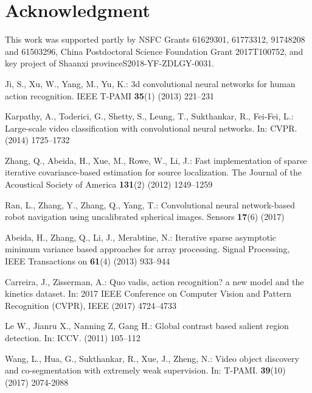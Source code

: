 \documentclass[runningheads,a4paper]{llncs}
\begin{document}
\section*{Acknowledgment}
This work was supported partly by NSFC Grants 61629301, 61773312, 91748208 and 61503296, China Postdoctoral Science Foundation Grant 2017T100752, and key project of Shaanxi provinceS2018-YF-ZDLGY-0031.

%
%
\begin{thebibliography}{10}
	Ji, S., Xu, W., Yang, M., Yu, K.:
	\newblock 3d convolutional neural networks for human action recognition.
	\newblock IEEE T-PAMI \textbf{35}(1) (2013)  221--231

	Karpathy, A., Toderici, G., Shetty, S., Leung, T., Sukthankar, R., Fei-Fei, L.:
	\newblock Large-scale video classification with convolutional neural networks.
	\newblock In: CVPR. (2014)  1725--1732

	Zhang, Q., Abeida, H., Xue, M., Rowe, W., Li, J.:
	\newblock Fast implementation of sparse iterative covariance-based estimation
	for source localization.
	\newblock The Journal of the Acoustical Society of America \textbf{131}(2)
	(2012)  1249--1259

	Ran, L., Zhang, Y., Zhang, Q., Yang, T.:
	\newblock Convolutional neural network-based robot navigation using
	uncalibrated spherical images.
	\newblock Sensors \textbf{17}(6) (2017)

	Abeida, H., Zhang, Q., Li, J., Merabtine, N.:
	\newblock Iterative sparse asymptotic minimum variance based approaches for
	array processing.
	\newblock Signal Processing, IEEE Transactions on \textbf{61}(4) (2013)
	933--944

	Carreira, J., Zisserman, A.:
	\newblock Quo vadis, action recognition? a new model and the kinetics dataset.
	\newblock In: 2017 IEEE Conference on Computer Vision and Pattern Recognition
	(CVPR), IEEE (2017)  4724--4733

	Le W., Jianru X., Nanning Z, Gang H.:
	\newblock Global contrast based salient region detection.
	\newblock In: ICCV. (2011)  105--112

	Wang, L., Hua, G., Sukthankar, R., Xue, J., Zheng, N.:
	\newblock Video object discovery and co-segmentation with extremely weak supervision.
	\newblock In: T-PAMI. \textbf{39}(10) (2017)  2074-2088


\end{thebibliography}
\end{document}
